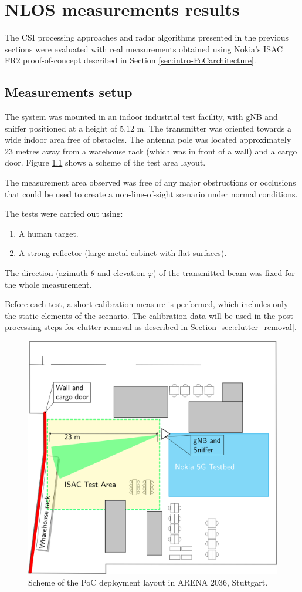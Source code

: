 \chapter{NLOS measurements results}

The CSI processing approaches and radar algorithms presented in the previous sections were evaluated with real measurements obtained using Nokia's ISAC FR2 proof-of-concept described in Section \ref{sec:intro-PoCarchitecture}.

\section{Measurements setup}
\label{sec:Test1_meas_scenario}

The system was mounted in an indoor industrial test facility, with gNB and sniffer positioned at a height of $5.12$ m. The transmitter was oriented towards a wide  indoor area free of obstacles. The antenna pole was located approximately 23 metres away from a warehouse rack (which was in front of a wall) and a cargo door.
Figure \ref{fig:Test1_arena_plan} shows a scheme of the test area layout.

The measurement area observed was free of any major obstructions or occlusions that could be used to create a non-line-of-sight scenario under normal conditions. 

The tests were carried out using:

\begin{enumerate}
	\item A human target.
	\item A strong reflector (large metal cabinet with flat surfaces).
\end{enumerate}

The direction (azimuth $\theta$ and elevation $\varphi$) of the transmitted beam was fixed for the whole measurement.

Before each test, a short calibration measure is performed, which includes only the static elements of the scenario. The calibration data will be used in the post-processing steps for clutter removal as described in Section \ref{sec:clutter_removal}.

\begin{figure}[H]
	\centering
	\includegraphics[width=.6\textwidth]{Images/Test1/arena_plan}
	\caption{Scheme of the PoC deployment layout in ARENA 2036, Stuttgart.}
	\label{fig:Test1_arena_plan}
\end{figure}


